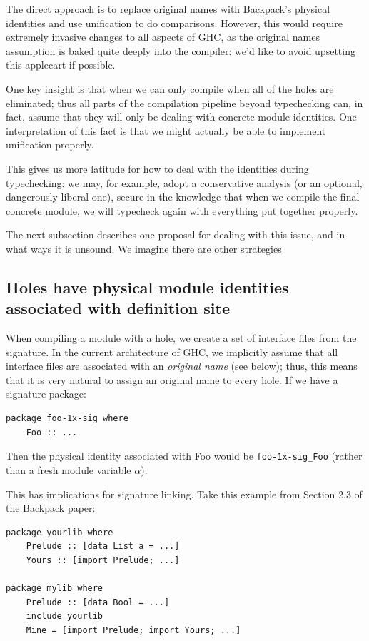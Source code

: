 \documentclass{article}
\begin{document}
The direct approach is to replace original names with Backpack's
physical identities and use unification to do comparisons.  However,
this would require extremely invasive changes to all aspects of GHC, as
the original names assumption is baked quite deeply into the compiler:
we'd like to avoid upsetting this applecart if possible.

One key insight is that when we can only compile when all of the holes
are eliminated; thus all parts of the compilation pipeline beyond
typechecking can, in fact, assume that they will only be dealing with
concrete module identities.  One interpretation of this fact is that
we might actually be able to implement unification properly.

This gives us more latitude for how to
deal with the identities during typechecking: we may, for example,
adopt a conservative analysis (or an optional, dangerously liberal one),
secure in the knowledge that when we compile the final concrete module,
we will typecheck again with everything put together properly.

The next subsection describes one proposal for dealing with this issue,
and in what ways it is unsound.  We imagine there are other strategies

\subsection{Holes have physical module identities associated with definition site}

When compiling a module with a hole, we create a set of interface files
from the signature.  In the current architecture of GHC, we implicitly
assume that all interface files are associated with an \emph{original
name} (see below); thus, this means that it is very natural to assign an
original name to every hole.  If we have a signature package:

\begin{verbatim}
package foo-1x-sig where
    Foo :: ...
\end{verbatim}

Then the physical identity associated with Foo would be
\verb|foo-1x-sig_Foo| (rather than a fresh module variable $\alpha$).

This has implications for signature linking. Take this example from
Section 2.3 of the Backpack paper:

\begin{verbatim}
package yourlib where
    Prelude :: [data List a = ...]
    Yours :: [import Prelude; ...]

package mylib where
    Prelude :: [data Bool = ...]
    include yourlib
    Mine = [import Prelude; import Yours; ...]
\end{verbatim}
\end{document}
